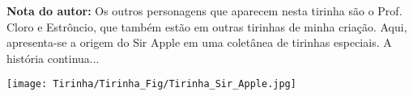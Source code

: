 \newpage
\thispagestyle{empty}

\vspace{-1cm} %
\noindent %
\begin{minipage}{7.7cm}%
\protect\vspace{16.5cm}%
  \large{{\bfseries\sffamily Nota do autor:} \sffamily Os outros personagens que aparecem nesta tirinha são o Prof. Cloro e Estrôncio, que também estão em outras tirinhas de minha criação. Aqui, apresenta-se a origem do Sir Apple em uma coletânea de tirinhas especiais. A história continua...}
\end{minipage}
\hspace*{\fill} %
\begin{minipage}{9cm} %
    \texttt{[image: Tirinha/Tirinha\_Fig/Tirinha\_Sir\_Apple.jpg]}
\end{minipage}










